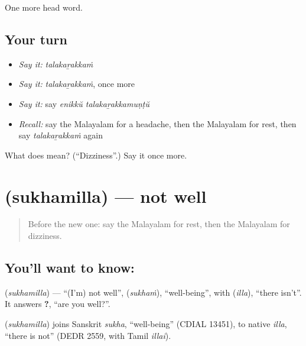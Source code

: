 \begin{grammarlens}[title={What you've built}]
One more head word.
\end{grammarlens}

\subsection*{Your turn}
\begin{itemize}
\raggedright
  \item \emph{Say it:} \emph{talakaṟakkaṁ}
  \item \emph{Say it:} \emph{talakaṟakkaṁ}, once more
  \item \emph{Say it:} say \emph{enikkŭ talakaṟakkamuṇṭŭ}
  \item \emph{Recall:} say the Malayalam for a headache, then the Malayalam for rest, then say \emph{talakaṟakkaṁ} again
\end{itemize}

\begin{tcolorbox}[breakable,colback=teal!4,colframe=teal!35!black,title={Before you move on}]
What does  mean? (\textquotedblleft{}Dizziness\textquotedblright{}.) Say it once more.
\end{tcolorbox}
\section[\texorpdfstring{\ml{സുഖമില്ല} (sukhamilla)}{സുഖമില്ല (sukhamilla)}]{ (sukhamilla) — not well}

\label{lesson:ML-C115-notwell}



\begin{quote}
Before the new one: say the Malayalam for rest, then the Malayalam for dizziness.
\end{quote}

\subsection*{You'll want to know: }
\textbf{} (\emph{sukhamilla}) — \textquotedblleft{}(I'm) not well\textquotedblright{}, \textbf{} (\emph{sukhaṁ}), \textquotedblleft{}well-being\textquotedblright{}, with \textbf{} (\emph{illa}), \textquotedblleft{}there isn't\textquotedblright{}. It answers \textbf{?}, \textquotedblleft{}are you well?\textquotedblright{}.

\begin{cousinweb}
\textbf{} (\emph{sukhamilla}) joins Sanskrit \emph{sukha}, \textquotedblleft{}well-being\textquotedblright{} (CDIAL 13451), to native \emph{illa}, \textquotedblleft{}there is not\textquotedblright{} (DEDR 2559, with Tamil \emph{illai}).
\end{cousinweb}

